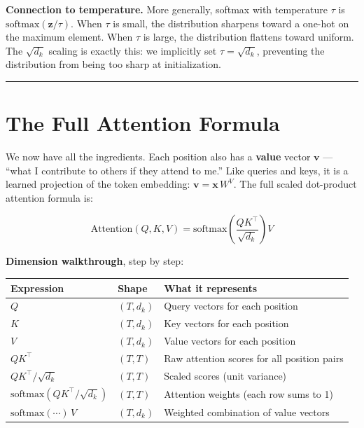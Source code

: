 
\textbf{Connection to temperature.} More generally, softmax with temperature $\tau$ is $\mathrm{softmax}(\mathbf{z} / \tau)$. When $\tau$ is small, the distribution sharpens toward a one-hot on the maximum element. When $\tau$ is large, the distribution flattens toward uniform. The $\sqrt{d_k}$ scaling is exactly this: we implicitly set $\tau = \sqrt{d_k}$, preventing the distribution from being too sharp at initialization.

\bigskip\hrule\bigskip

\section{The Full Attention Formula}

We now have all the ingredients. Each position also has a \textbf{value} vector $\mathbf{v}$ --- ``what I contribute to others if they attend to me.'' Like queries and keys, it is a learned projection of the token embedding: $\mathbf{v} = \mathbf{x}\, W^V$. The full scaled dot-product attention formula is:

\[
\mathrm{Attention}(Q, K, V) = \mathrm{softmax}\!\left(\frac{QK^\top}{\sqrt{d_k}}\right) V
\]

\textbf{Dimension walkthrough}, step by step:

\begin{tabular}{lll}
\toprule
Expression & Shape & What it represents \\
\midrule
$Q$ & $(T, d_k)$ & Query vectors for each position \\
$K$ & $(T, d_k)$ & Key vectors for each position \\
$V$ & $(T, d_k)$ & Value vectors for each position \\
$QK^\top$ & $(T, T)$ & Raw attention scores for all position pairs \\
$QK^\top / \sqrt{d_k}$ & $(T, T)$ & Scaled scores (unit variance) \\
$\mathrm{softmax}(QK^\top / \sqrt{d_k})$ & $(T, T)$ & Attention weights (each row sums to 1) \\
$\mathrm{softmax}(\cdots)\, V$ & $(T, d_k)$ & Weighted combination of value vectors \\
\bottomrule
\end{tabular}

